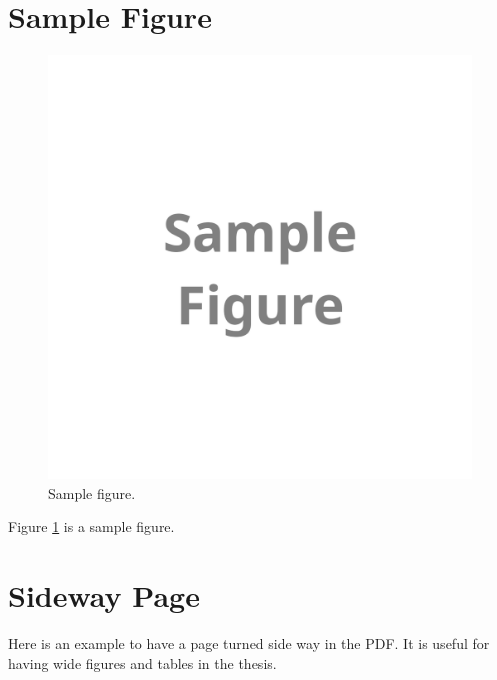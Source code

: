 
\section{Sample Figure}

\begin{figure}
\includegraphics[width=\hsize]{./figures/figure_sample.png}
\caption{Sample figure.}
\label{figure_sample}
\end{figure}

Figure \ref{figure_sample} is a sample figure.

\section{Sideway Page}

Here is an example to have a page turned side way in the PDF. It is useful for having wide figures and tables in the thesis.

